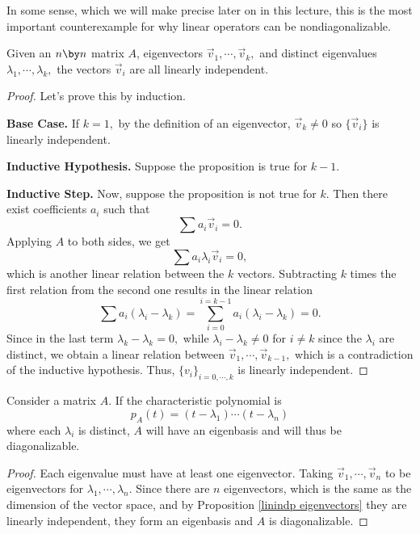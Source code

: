 In some sense, which we will make precise later on in this lecture, this is the most important counterexample for why linear operators can be nondiagonalizable.

\begin{proposition}\label{linindp eigenvectors}
Given an $n \by n$ matrix $A$, eigenvectors $\vec{v}_1, \cdots, \vec{v}_k,$ and distinct eigenvalues $\lambda_1, \cdots, \lambda_k,$ the vectors $\vec{v}_i$ are all linearly independent.
\end{proposition}
\begin{proof}
Let's prove this by induction. 



\textbf{Base Case.} If $k = 1,$ by the definition of an eigenvector, $\vec{v}_k \neq 0$ so $\{\vec{v}_i\}$ is linearly independent. 

\textbf{Inductive Hypothesis.} Suppose the proposition is true for $k - 1.$ 

\textbf{Inductive Step.} Now, suppose the proposition is not true for $k$. Then there exist coefficients $a_i$ such that \[\sum a_i \vec{v}_i = 0.\] Applying $A$ to both sides, we get 
\[
\sum a_i\lambda_i \vec{v}_i = 0,
\]
which is another linear relation between the $k$ vectors. Subtracting $k$ times the first relation from the second one results in the linear relation 
\[
\sum a_i(\lambda_i - \lambda_k) = \sum_{i = 0}^{i = k-1} a_i(\lambda_i - \lambda_k) = 0.
\]
Since in the last term $\lambda_k - \lambda_k = 0,$ while $\lambda_i - \lambda_k \neq 0$ for $i \neq k$ since the $\lambda_i$ are distinct, we obtain a linear relation between $\vec{v}_1, \cdots, \vec{v}_{k - 1},$ which is a contradiction of the inductive hypothesis. Thus, $\{v_i\}_{i = 0, \cdots, k}$ is linearly independent. 
\end{proof}

\begin{corollary}
Consider a matrix $A$. If the characteristic polynomial is 
\[
p_A(t) = (t - \lambda_1) \cdots (t - \lambda_n)
\]
where each $\lambda_i$ is distinct, $A$ will have an eigenbasis and will thus be diagonalizable. 
\end{corollary}
\begin{proof}
Each eigenvalue must have at least one eigenvector. Taking $\vec{v}_1, \cdots, \vec{v}_n$ to be eigenvectors for $\lambda_1, \cdots, \lambda_n$. Since there are $n$ eigenvectors, which is the same as the dimension of the vector space, and by Proposition \ref{linindp eigenvectors} they are linearly independent, they form an eigenbasis and $A$ is diagonalizable. 
\end{proof}

